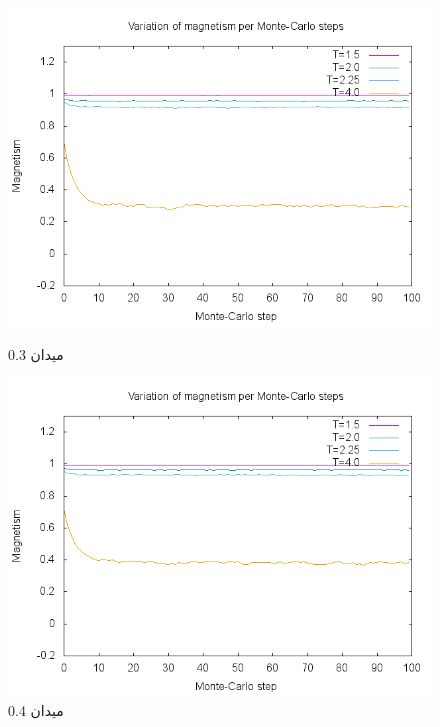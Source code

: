 \documentclass[a4paper,12pt]{article}
\begin{document}
\begin{figure}
\begin{center}
\includegraphics[scale=.8]{H-3.png}\caption{میدان 0.3}
\includegraphics[scale=.8]{H-4.png}\caption{میدان 0.4}
\end{center}
\end{figure}
\end{document}

